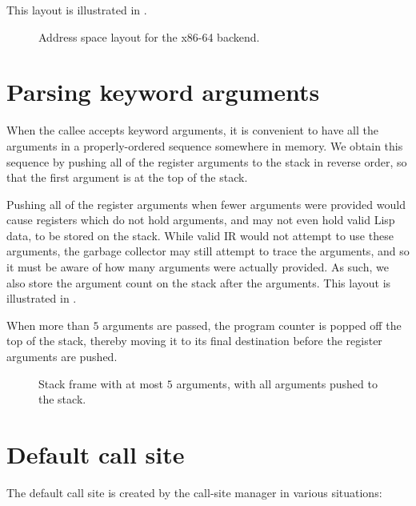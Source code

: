 This layout is illustrated in .

\begin{figure}
\begin{center}
\end{center}
\caption{\label{fig-address-space-x86-64}
Address space layout for the x86-64 backend.}
\end{figure}

\section{Parsing keyword arguments}

When the callee accepts keyword arguments, it is convenient to have
all the arguments in a properly-ordered sequence somewhere in memory.
We obtain this sequence by pushing all of the register arguments to
the stack in reverse order, so that the first argument is at the top
of the stack.

Pushing all of the register arguments when fewer arguments were
provided would cause registers which do not hold arguments, and may
not even hold valid Lisp data, to be stored on the stack.  While valid
IR would not attempt to use these arguments, the garbage collector may
still attempt to trace the arguments, and so it must be aware of how
many arguments were actually provided. As such, we also store the
argument count on the stack after the arguments.  This layout is
illustrated in .

When more than $5$ arguments are passed, the program counter
is popped off the top of the stack, thereby moving it to its final
destination before the register arguments are pushed.


\begin{figure}
\begin{center}
\end{center}
\caption{\label{fig-x86-64-stack-frame-with-pushed-arguments}
  Stack frame with at most $5$ arguments, with all arguments pushed
  to the stack.}
\end{figure}

\section{Default call site}

The default call site is created by the call-site manager in various
situations:

